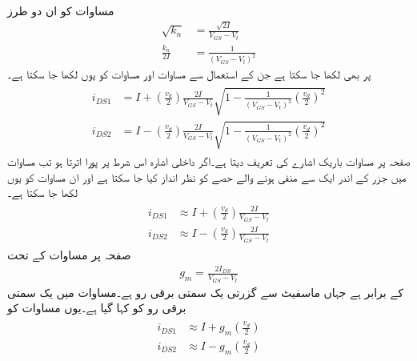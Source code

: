 مساوات  کو ان دو طرز
\begin{align*}
\sqrt{k_n}&=\frac{\sqrt{2I}}{V_{GS}-V_t}\\
\frac{k_n}{2I}&=\frac{1}{\left(V_{GS}-V_t \right)^2}
\end{align*}
پر بھی لکھا جا سکتا ہے جن کے استعمال سے  مساوات  اور مساوات 
کو یوں لکھا جا سکتا ہے۔
\begin{gather}
\begin{aligned}\label{مساوات_تفرقی_دونوں_ماسفیٹ_کا_برقی_رو}
i_{DS1}&=I+\left(\frac{v_d}{2}\right) \frac{2I}{V_{GS}-V_t} \sqrt{1-\frac{1}{\left(V_{GS}-V_t \right)^2} \left(\frac{v_d}{2} \right)^2}\\
i_{DS2}&=I-\left(\frac{v_d}{2}\right) \frac{2I}{V_{GS}-V_t} \sqrt{1-\frac{1}{\left(V_{GS}-V_t \right)^2} \left(\frac{v_d}{2} \right)^2}
\end{aligned}
\end{gather}
صفحہ  پر مساوات  باریک اشارے کی تعریف
   دیتا ہے۔اگر داخلی اشارہ اس شرط پر پورا اترتا ہو تب  مساوات  میں  جزر    کے اندر ایک سے منفی ہونے والے حصے کو نظر انداز کیا جا سکتا ہے اور ان مساوات کو یوں لکھا جا سکتا ہے۔
\begin{gather}
\begin{aligned}\label{مساوات_تفرقی_دونوں_ماسفیٹ_کا_برقی_رو_خطی_مساوات}
i_{DS1}& \approx I+\left(\frac{v_d}{2}\right) \frac{2I}{V_{GS}-V_t} \\
i_{DS2}& \approx I-\left(\frac{v_d}{2}\right) \frac{2I}{V_{GS}-V_t}
\end{aligned}
\end{gather}
صفحہ  پر مساوات  کے تحت
\begin{align*}
g_m=\frac{2 I_{DS}}{V_{GS}-V_t}
\end{align*}
کے برابر ہے جہاں  ماسفیٹ سے گزرتی یک سمتی برقی رو ہے۔مساوات  میں یک سمتی برقی رو کو  کہا گیا ہے۔یوں مساوات  کو
\begin{gather}
\begin{aligned}\label{مساوات_تفرقی_دونوں_ماسفیٹ_کا_برقی_رو_خطی_مساوات_الف}
i_{DS1}& \approx I+g_m \left(\frac{v_d}{2}\right) \\
i_{DS2}& \approx I-g_m \left(\frac{v_d}{2}\right)
\end{aligned}
\end{gather}
